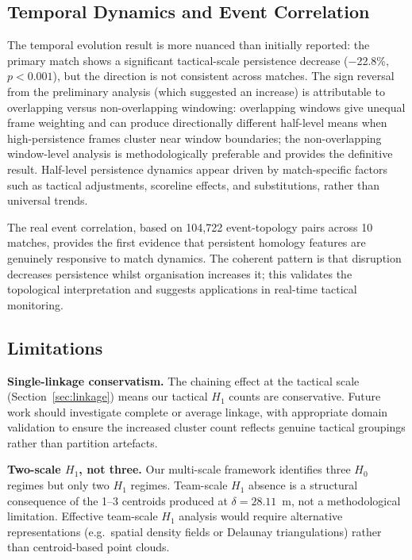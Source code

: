 \subsection{Temporal Dynamics and Event Correlation}

The temporal evolution result is more nuanced than initially reported: the primary match shows a significant tactical-scale persistence decrease (\(-\)22.8\%, \(p<0.001\)), but the direction is not consistent across matches. The sign reversal from the preliminary analysis (which suggested an increase) is attributable to overlapping versus non-overlapping windowing: overlapping windows give unequal frame weighting and can produce directionally different half-level means when high-persistence frames cluster near window boundaries; the non-overlapping window-level analysis is methodologically preferable and provides the definitive result. Half-level persistence dynamics appear driven by match-specific factors such as tactical adjustments, scoreline effects, and substitutions, rather than universal trends.

The real event correlation, based on 104,722 event-topology pairs across 10 matches, provides the first evidence that persistent homology features are genuinely responsive to match dynamics. The coherent pattern is that disruption decreases persistence whilst organisation increases it; this validates the topological interpretation and suggests applications in real-time tactical monitoring.

\subsection{Limitations}

\textbf{Single-linkage conservatism.} The chaining effect at the tactical scale (Section~\ref{sec:linkage}) means our tactical \(H_1\) counts are conservative. Future work should investigate complete or average linkage, with appropriate domain validation to ensure the increased cluster count reflects genuine tactical groupings rather than partition artefacts.

\textbf{Two-scale \(H_1\), not three.} Our multi-scale framework identifies three \(H_0\) regimes but only two \(H_1\) regimes. Team-scale \(H_1\) absence is a structural consequence of the 1--3 centroids produced at \(\delta=28.11\)~m, not a methodological limitation. Effective team-scale \(H_1\) analysis would require alternative representations (e.g.\ spatial density fields or Delaunay triangulations) rather than centroid-based point clouds.

